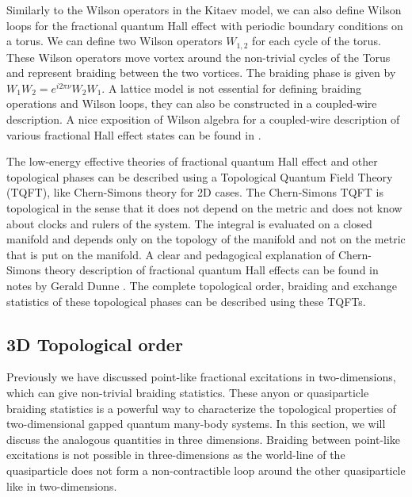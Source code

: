 Similarly to the Wilson operators in the Kitaev model, we can also define Wilson loops for the fractional quantum Hall effect with periodic boundary conditions on a torus. We can define two Wilson operators $W_{1,2}$ for each cycle of the torus. These Wilson operators move vortex around the non-trivial cycles of the Torus and represent braiding between the two vortices. The braiding phase is given by $W_1 W_2 = e^{i 2 \pi \nu} W_2 W_1$. A lattice model is not essential for defining braiding operations and Wilson loops, they can also be constructed in a coupled-wire description. A nice exposition of Wilson algebra for a coupled-wire description of various fractional Hall effect states can be found in \cite{TeoKaneCouplewires}. 

The low-energy effective theories of fractional quantum Hall effect and other topological phases can be described using a Topological Quantum Field Theory (TQFT), like Chern-Simons theory for 2D cases. The Chern-Simons TQFT is topological in the sense that it does not depend on the metric and does not know about clocks and rulers of the system. The integral is evaluated on a closed manifold and depends only on the topology of the manifold and not on the metric that is put on the manifold. A clear and pedagogical explanation of Chern-Simons theory description of fractional quantum Hall effects can be found in notes by Gerald Dunne \cite{Dunne99}. The complete topological order, braiding and exchange statistics of these topological phases can be described using these TQFTs. 

\subsection{3D Topological order}
Previously we have discussed point-like fractional excitations in two-dimensions, which can give non-trivial braiding statistics. These anyon or quasiparticle braiding statistics is a powerful way to characterize the topological properties of two-dimensional gapped quantum many-body systems. In this section, we will discuss the analogous quantities in three dimensions. Braiding between point-like excitations is not possible in three-dimensions as the world-line of the quasiparticle does not form a non-contractible loop around the other quasiparticle like in two-dimensions. 

